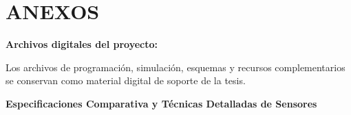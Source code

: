 \documentclass[12pt,a4paper,oneside]{report}
\begin{document}
\appendix
\chapter*{ANEXOS}\label{anexos}

\textbf{Archivos digitales del proyecto:}

Los archivos de programación, simulación, esquemas y recursos complementarios se conservan como material digital de soporte de la tesis.

\textbf{Especificaciones Comparativa y Técnicas Detalladas de Sensores}

\label{tbl:4.1}
\end{document}
